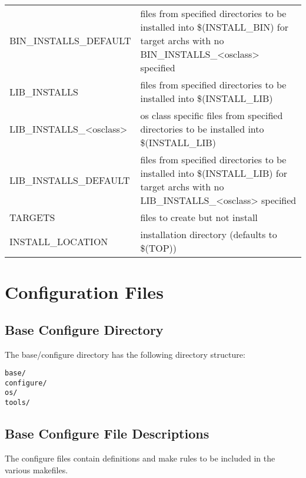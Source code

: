 \begin{center}
\begin{longtable}{p{2.94784in}p{3.76247in}}
BIN\_INSTALLS\_DEFAULT & files from specified directories to be installed into \$(INSTALL\_BIN) for target archs with no BIN\_INSTALLS\_\textless{}osclass\textgreater{} specified\\
LIB\_INSTALLS & files from specified directories to be installed into \$(INSTALL\_LIB)\\
LIB\_INSTALLS\_\textless{}osclass\textgreater{} & os class specific files from specified directories to be installed into \$(INSTALL\_LIB)\\
LIB\_INSTALLS\_DEFAULT & files from specified directories to be installed into \$(INSTALL\_LIB) for target archs with no LIB\_INSTALLS\_\textless{}osclass\textgreater{} specified\\
TARGETS & files to create but not install\\
INSTALL\_LOCATION & installation directory (defaults to \$(TOP))
\end{longtable}\end{center}


\section{Configuration Files}

\subsection{Base Configure Directory}

The base/configure directory has the following directory structure:

\begin{verbatim}base/
configure/
os/
tools/

\end{verbatim}\subsection{Base Configure File Descriptions}

The configure files contain definitions and make rules to be included in the various makefiles.

